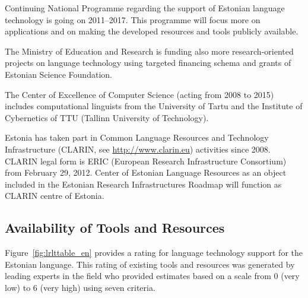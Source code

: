 \documentclass[]{../metanetpaper}
\begin{document}
\begin{multicols}{2}
Continuing National Programme \cite{ekktt2} regarding the support of Estonian language technology is going on 2011--2017. 
This programme will focus more on applications and on making the developed resources and tools publicly available.

The Ministry of Education and Research is funding also more research-oriented projects on language technology using targeted financing schema and grants of Estonian Science Foundation.

The Center of Excellence of Computer Science (acting from 2008 to 2015) includes computational linguists from the University of Tartu and the Institute of Cybernetics of TTU (Tallinn University of Technology). 

Estonia has taken part in Common Language Resources and Technology
Infrastructure (CLARIN, see  \url{http://www.clarin.eu}) activities
since 2008. CLARIN legal form is ERIC (European Research
Infrastructure Consortium) from February 29, 2012. Center of Estonian
Language Resources as an object included in the Estonian Research
Infrastructures Roadmap will function as CLARIN centre of Estonia. 
  
\subsection{Availability of Tools and Resources}

Figure~\ref{fig:lrlttable_en} provides a rating for language technology support for the Estonian language. This rating of existing tools and resources was generated by leading experts in the field who provided estimates based on a scale from 0 (very low) to 6 (very high) using seven criteria.


\end{multicols}
\end{document}
